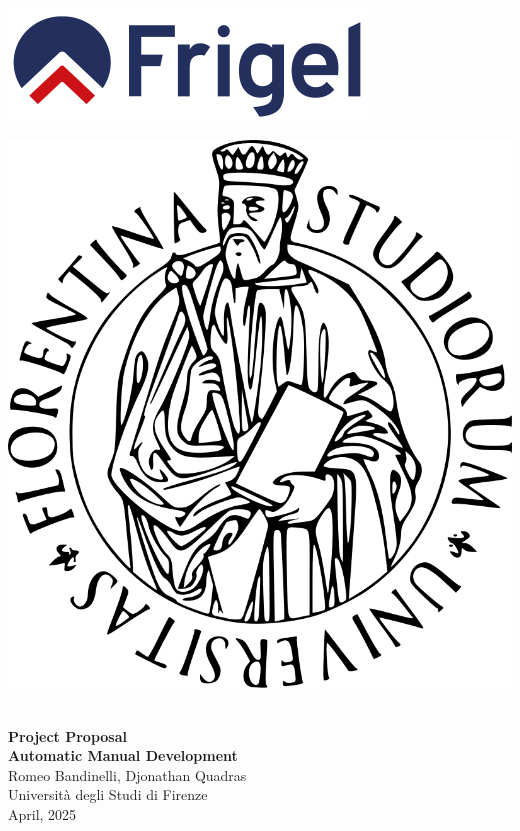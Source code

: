 \documentclass{article}%
\begin{document}
%
\normalsize%
%
\begin{titlepage}%
\centering%
\vspace*{1cm}%

    \begin{minipage}{0.45\textwidth}
    \includegraphics[scale=0.5]{frigel-logo.png}
    \end{minipage}
    \hfill
    \begin{minipage}{0.45\textwidth}
    \begin{flushright}
        \includegraphics[scale=0.1]{unifi-logo.png}
    \end{flushright}
    \end{minipage}
    \\[1.5cm]
\Huge\textbf{Project Proposal}\\[0.5cm]%
\Large\textbf{Automatic Manual Development}\\[2cm]%
\large Romeo Bandinelli, Djonathan Quadras\\%
\large Università degli Studi di Firenze\\[2cm]%
\large April, 2025%
\vfill%
\end{titlepage}%
%
\onehalfspacing%
\setlength{\parindent}{12pt}%
\tableofcontents%
\newpage%
\end{document}
